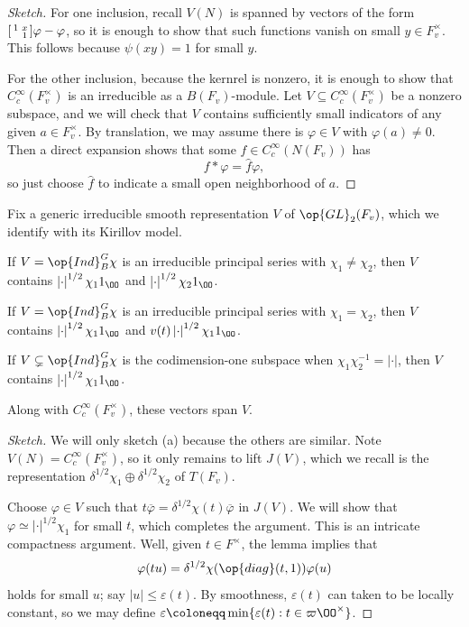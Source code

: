 \documentclass{article}
\begin{document}
\begin{proof}[Sketch]
	For one inclusion, recall $V(N)$ is spanned by vectors of the form $\begin{bsmallmatrix}
		1 & x \\ & 1
	\end{bsmallmatrix}\varphi-\varphi$, so it is enough to show that such functions vanish on small $y\in F_v^\times$. This follows because $\psi(xy)=1$ for small $y$.

	For the other inclusion, because the kernrel is nonzero, it is enough to show that $C_c^\infty(F_v^\times)$ is an irreducible as a $B(F_v)$-module. Let $V\subseteq C_c^\infty(F_v^\times)$ be a nonzero subspace, and we will check that $V$ contains sufficiently small indicators of any given $a\in F_v^\times$. By translation, we may assume there is $\varphi\in V$ with $\varphi(a)\ne0$. Then a direct expansion shows that some $f\in C_c^\infty(N(F_v))$ has
	\[f*\varphi=\widehat f\varphi,\]
	so just choose $\widehat f$ to indicate a small open neighborhood of $a$.
\end{proof}
\begin{proposition}
	Fix a generic irreducible smooth representation $V$ of $\op{GL}_2(F_v)$, which we identify with its Kirillov model.
	\begin{listalph}
		\item If $V=\op{Ind}_B^G\chi$ is an irreducible principal series with $\chi_1\ne\chi_2$, then $V$ contains $\left|\cdot\right|^{1/2}\chi_11_\OO$ and $\left|\cdot\right|^{1/2}\chi_21_\OO$.
		\item If $V=\op{Ind}_B^G\chi$ is an irreducible principal series with $\chi_1=\chi_2$, then $V$ contains $\left|\cdot\right|^{1/2}\chi_11_\OO$ and $v(t)\left|\cdot\right|^{1/2}\chi_11_\OO$.
		\item If $V\subsetneq\op{Ind}_B^G\chi$ is the codimension-one subspace when $\chi_1\chi_2^{-1}=\left|\cdot\right|$, then $V$ contains $\left|\cdot\right|^{1/2}\chi_11_\OO$.
	\end{listalph}
	Along with $C_c^\infty(F_v^\times)$, these vectors span $V$.
\end{proposition}
\begin{proof}[Sketch]
	We will only sketch (a) because the others are similar. Note $V(N)=C_c^\infty(F_v^\times)$, so it only remains to lift $J(V)$, which we recall is the representation $\delta^{1/2}\chi_1\oplus\delta^{1/2}\chi_2$ of $T(F_v)$.
	
	Choose $\varphi\in V$ such that $t\overline\varphi=\delta^{1/2}\chi(t)\overline\varphi$ in $J(V)$. We will show that $\varphi\simeq\left|\cdot\right|^{1/2}\chi_1$ for small $t$, which completes the argument. This is an intricate compactness argument. Well, given $t\in F^\times$, the lemma implies that
	\[\varphi(tu)=\delta^{1/2}\chi(\op{diag}(t,1))\varphi(u)\]
	holds for small $u$; say $\left|u\right|\le\varepsilon(t)$. By smoothness, $\varepsilon(t)$ can taken to be locally constant, so we may define $\varepsilon\coloneqq\min\{\varepsilon(t):t\in\varpi\OO^\times\}$.
\end{proof}
\end{document}
